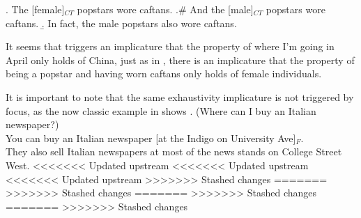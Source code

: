 \documentclass[GPFinal]{subfiles}
\begin{document}
\ex. The [female]$_{CT}$ popstars wore caftans.
\a.\# And the [male]$_{CT}$ popstars wore caftans.
\b. In fact, the male popstars also wore caftans.

It seems that \LLast triggers an implicature that the property of where I'm going in April only holds of China, just as in \Last, there is an implicature that the property of being a popstar and having worn caftans only holds of female individuals.

It is important to note that the same exhaustivity implicature is not triggered by focus, as the now classic example in \Next shows
\ex. (Where can I buy an Italian newspaper?)\\
You can buy an Italian newspaper [at the Indigo on University Ave]$_F$.\\
They also sell Italian newspapers at most of the news stands on College Street West.
<<<<<<< Updated upstream
<<<<<<< Updated upstream
<<<<<<< Updated upstream
>>>>>>> Stashed changes
=======
>>>>>>> Stashed changes
=======
>>>>>>> Stashed changes
=======
>>>>>>> Stashed changes
\end{document}
